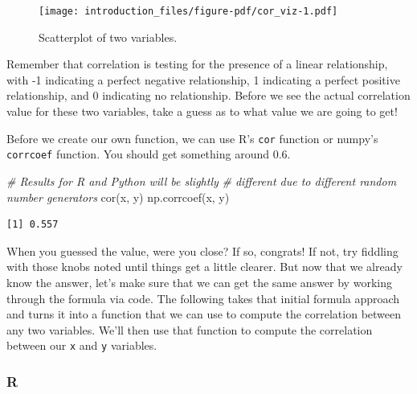 \documentclass[
  letterpaper,
]{krantz}
\newenvironment{Shaded}{}{}
\newcommand{\CommentTok}[1]{\textcolor[rgb]{0.38,0.63,0.69}{\textit{#1}}}
\newcommand{\FunctionTok}[1]{\textcolor[rgb]{0.02,0.16,0.49}{#1}}
\newcommand{\NormalTok}[1]{#1}
\begin{document}
\begin{figure}

{\centering \texttt{[image: introduction\_files/figure-pdf/cor\_viz-1.pdf]}

}

\caption{Scatterplot of two variables.}

\end{figure}

Remember that correlation is testing for the presence of a linear
relationship, with -1 indicating a perfect negative relationship, 1
indicating a perfect positive relationship, and 0 indicating no
relationship. Before we see the actual correlation value for these two
variables, take a guess as to what value we are going to get!

Before we create our own function, we can use R's \texttt{cor} function
or numpy's \texttt{corrcoef} function. You should get something around
0.6.

\begin{Shaded}
\begin{Highlighting}[]
\CommentTok{\# Results for R and Python will be slightly}
\CommentTok{\# different due to different random number generators}
\FunctionTok{cor}\NormalTok{(x, y)}
\FunctionTok{np.corrcoef}\NormalTok{(x, y)}
\end{Highlighting}
\end{Shaded}

\begin{verbatim}
[1] 0.557
\end{verbatim}

When you guessed the value, were you close? If so, congrats! If not, try
fiddling with those knobs noted until things get a little clearer. But
now that we already know the answer, let's make sure that we can get the
same answer by working through the formula via code. The following takes
that initial formula approach and turns it into a function that we can
use to compute the correlation between any two variables. We'll then use
that function to compute the correlation between our \texttt{x} and
\texttt{y} variables.

\subsubsection{R}
\end{document}
